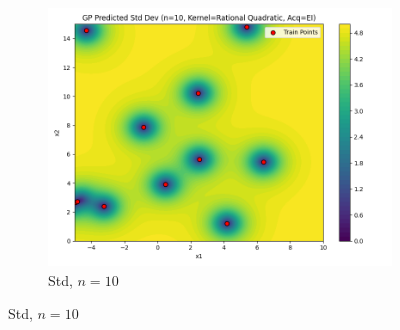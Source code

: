 \documentclass[a4paper,12pt]{article}
\begin{document}
\begin{figure}[H]
\begin{subfigure}{0.3\textwidth}
\end{subfigure}
\begin{subfigure}{0.3\textwidth}
    \includegraphics[width=\linewidth]{Task-02/images/gp_std_rational_quadratic_n10_EI.png}
    \caption{Std, $n=10$}
\end{subfigure}


\end{figure}
\end{document}
